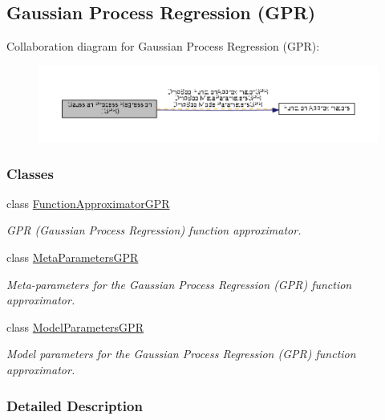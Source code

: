 \hypertarget{group__GPR}{\subsection{Gaussian Process Regression (G\+P\+R)}
\label{group__GPR}
}
Collaboration diagram for Gaussian Process Regression (G\+P\+R)\+:
\nopagebreak
\begin{figure}[H]
\begin{center}
\leavevmode
\includegraphics[width=350pt]{group__GPR}
\end{center}
\end{figure}
\subsubsection*{Classes}
\begin{DoxyCompactItemize}
\item 
class \hyperlink{classDmpBbo_1_1FunctionApproximatorGPR}{Function\+Approximator\+G\+P\+R}
\begin{DoxyCompactList}\small\item\em G\+P\+R (Gaussian Process Regression) function approximator. \end{DoxyCompactList}\item 
class \hyperlink{classDmpBbo_1_1MetaParametersGPR}{Meta\+Parameters\+G\+P\+R}
\begin{DoxyCompactList}\small\item\em Meta-\/parameters for the Gaussian Process Regression (G\+P\+R) function approximator. \end{DoxyCompactList}\item 
class \hyperlink{classDmpBbo_1_1ModelParametersGPR}{Model\+Parameters\+G\+P\+R}
\begin{DoxyCompactList}\small\item\em Model parameters for the Gaussian Process Regression (G\+P\+R) function approximator. \end{DoxyCompactList}\end{DoxyCompactItemize}


\subsubsection{Detailed Description}
